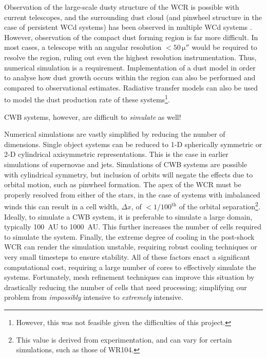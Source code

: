 \noindent
Observation of the large-scale dusty structure of the WCR is possible with current telescopes, and the surrounding dust cloud (and pinwheel structure in the case of persistent WCd systems) has been observed in multiple WCd systems \parencite{soulainSPHEREViewWolfRayet2018,callinghamAnisotropicWindsWolf2019}.
However, observation of the compact dust forming region is far more difficult.
In most cases, a telescope with an angular resolution $<50\,\si{\micro\arcsecond}$ would be required to resolve the region, ruling out even the highest resolution instrumentation.
Thus, numerical simulation is a requirement.
Implementation of a dust model in order to analyse how dust growth occurs within the region can also be performed and compared to observational estimates.
Radiative transfer models can also be used to model the dust production rate of these systems\footnote{However, this was not feasible given the difficulties of this project.}.

CWB systems, however, are difficult to \emph{simulate} as well!

Numerical simulations are vastly simplified by reducing the number of dimensions.
Single object systems can be reduced to 1-D spherically symmetric or 2-D cylindrical axisymmetric representations.
This is the case in earlier simulations of supernovae and jets.
Simulations of CWB systems are possible with cylindrical symmetry, but inclusion of orbits will negate the effects due to orbital motion, such as pinwheel formation.
The apex of the WCR must be properly resolved from either of the stars, in the case of systems with imbalanced winds this can result in a cell width, $\Delta x$, of $<1/100^{\text{th}}$ of the orbital separation\footnote{This value is derived from experimentation, and can vary for certain simulations, such as those of WR104.}.
Ideally, to simulate a CWB system, it is preferable to simulate a large domain, typically \SI{100}{AU} to \SI{1000}{AU}.
This further increases the number of cells required to simulate the system.
Finally, the extreme degree of cooling in the post-shock WCR can render the simulation unstable, requiring robust cooling techniques or very small timesteps to ensure stability.
All of these factors enact a significant computational cost, requiring a large number of cores to effectively simulate the systems.
Fortunately, mesh refinement techniques can improve this situation by drastically reducing the number of cells that need processing; simplifying our problem from \textit{impossibly} intensive to \textit{extremely} intensive.

